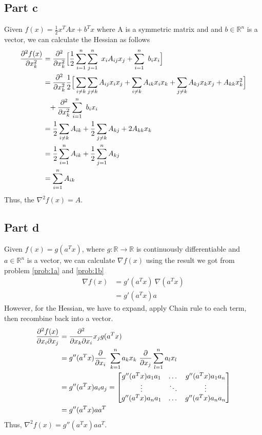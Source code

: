 \documentclass[11pt,a4paper,titlepage]{article}
\newcommand{\R}{\mathbb{R}}
\begin{document}
{\subsection{Part c}{
Given $f(x)=\frac{1}{2}x^{T}Ax+b^{T}x$ where A is a symmetric matrix and and $b \in \R^{n}$ is a vector, we can calculate the Hessian as follows
\begin{align*}
\pdv[2]{f(x)}{x_k} &= \pdv[2]{}{x_k}\Big[\frac{1}{2}\sum_{i=1}^{n}\sum_{j=1}^{n}\ x_iA_{ij}x_j + \sum_{i=1}^{n}\ b_ix_i\Big]\\
&=\pdv[2]{}{x_k}\frac{1}{2}\Big[\sum_{i\ne k}\sum_{j\ne k}A_{ij}x_{i}x_{j} + \sum_{i \ne k} A_{ik}x_{i}x_{k} + \sum_{j \ne k}A_{kj}x_{k}x_{j} + A_{kk} x_{k}^{2}\Big]\\
&\hphantom{=}+ \pdv[2]{}{x_k} \sum_{i=1}^n\ b_{i}x_{i}\\
&=\frac{1}{2}\sum_{i \ne k} A_{ik} + \frac{1}{2}\sum_{j \ne k} A_{kj}+2A_{kk}x_{k}\\
&=\frac{1}{2}\sum_{i=1}^{n} A_{ik} + \frac{1}{2}\sum_{j=1}^{n} A_{kj}\\
&=\sum_{i=1}^{n} A_{ik}
\end{align*}
Thus, the $\nabla^2 f(x) = A$.
}\label{prob:1c}
\subsection{Part d}{
Given $f(x)=g(a^Tx)$, where $g:\R\to\R$ is continuously differentiable and $a\in\R^n$ is a vector, we can calculate $\nabla f(x)$ using the result we got from problem \ref{prob:1a} and \ref{prob:1b}
\begin{align*}
\nabla f(x) &= g'(a^Tx)\ \nabla(a^Tx)
\\&= g'(a^Tx)a
\end{align*}
However, for the Hessian, we have to expand, apply Chain rule to each term, then recombine back into a vector.
\begin{align*}
\pdv{f(x)}{x_i}{x_j} &= \pdv{}{x_k}{x_i}{x_j} g(a^Tx)
\\&= g''(a^Tx)\pdv{}{x_i}\ \sum_{k=1}^{n} a_kx_k\ \pdv{}{x_j}\sum_{l=1}^{n} a_lx_l
\\&= g''(a^Tx)a_ia_j
=\begin{bmatrix}
		g''(a^Tx)a_1a_1 & \dots  & g''(a^Tx)a_1a_n	\\
        \vdots 			& \ddots & \vdots			\\
        g''(a^Tx)a_na_1 & \dots  & g''(a^Tx)a_na_n
	\end{bmatrix}
\\&=g''(a^Tx)aa^T
\end{align*}
Thus, $\nabla^2f(x)=g''(a^Tx)aa^T$.
}\label{prob:1d}
}\label{problem 1}
\end{document}
